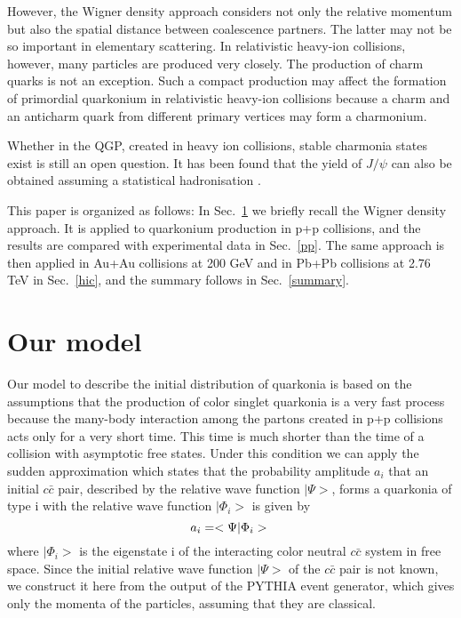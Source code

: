 \documentclass[twocolumn,aps,superscriptaddress,showpacs,nofootinbib,floatfix]{revtex4}
\newcommand{\com}[1]{{\sf\color[rgb]{0,0,1}{#1}}}
\newcommand{\be}{\begin{equation}}
\newcommand{\ee}{\end{equation}}
\begin{document}
However, the Wigner density approach considers not only the relative momentum but also the spatial distance between coalescence partners. The latter may not be so important in elementary scattering.
In relativistic heavy-ion collisions, however, many particles are produced very closely.
The production of charm quarks is not an exception. Such a compact production may affect the formation of primordial quarkonium in relativistic heavy-ion collisions because a charm and an anticharm quark from different primary vertices may form a charmonium.

Whether in the QGP, created in heavy ion collisions, stable charmonia states exist is still an open question. It has been found that the yield of $J/\psi$ can also be obtained assuming a statistical hadronisation \cite{BraunMunzinger:2000px, BraunMunzinger:2000ep,BraunMunzinger:2009ih}. 

This paper is organized as follows:
In Sec.~\ref{coalescence} we briefly recall the Wigner density approach.
It is applied to quarkonium production in p+p collisions, and the results are compared with experimental data in Sec.~\ref{pp}.
The same approach is then applied in Au+Au collisions at 200 GeV and in Pb+Pb collisions at 2.76 TeV in Sec.~\ref{hic}, and the summary follows in Sec.~\ref{summary}.



\section{Our model}\label{coalescence}
Our model to describe the initial distribution of quarkonia is based on the assumptions that the production of color singlet quarkonia is a very fast process because the many-body interaction among the partons created in p+p collisions acts only for a very short time. This time is much shorter than the time of a collision with asymptotic free states. Under this condition we can apply the sudden approximation which states that the probability amplitude $a_i$  that an initial $c \bar c$ pair, described by the relative wave function $|\Psi>$, forms a quarkonia of type i with the relative wave function $|\Phi_i>$ is given by
\be
a_i= <\Psi|\Phi_i>\nonumber\\
\ee
where  $|\Phi_i>$ is the eigenstate i of the interacting color neutral $c \bar c$ system in free space. Since the initial relative wave function
$|\Psi>$ of the $c\bar c$ pair is not known, we construct it here from the output of the PYTHIA event generator, which gives only the momenta of the particles, assuming that they are classical.
\end{document}
